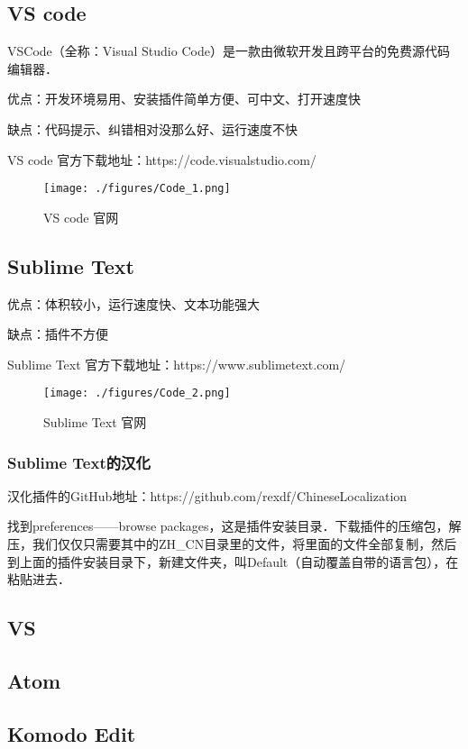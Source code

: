 
\begin{issues}
\issueTODO
\end{issues}

\subsection{VS code}

VSCode（全称：Visual Studio Code）是一款由微软开发且跨平台的免费源代码编辑器．

优点：开发环境易用、安装插件简单方便、可中文、打开速度快

缺点：代码提示、纠错相对没那么好、运行速度不快

VS code 官方下载地址：https://code.visualstudio.com/

\begin{figure}[ht]
\centering
\texttt{[image: ./figures/Code\_1.png]}
\caption{VS code 官网} \label{Code_fig1}
\end{figure}

\subsection{Sublime Text}

优点：体积较小，运行速度快、文本功能强大

缺点：插件不方便

Sublime Text 官方下载地址：https://www.sublimetext.com/

\begin{figure}[ht]
\centering
\texttt{[image: ./figures/Code\_2.png]}
\caption{Sublime Text 官网} \label{Code_fig2}
\end{figure}

\subsubsection{Sublime Text的汉化}

汉化插件的GitHub地址：https://github.com/rexdf/ChineseLocalization

找到preferences——browse packages，这是插件安装目录．下载插件的压缩包，解压，我们仅仅只需要其中的ZH_CN目录里的文件，将里面的文件全部复制，然后到上面的插件安装目录下，新建文件夹，叫Default（自动覆盖自带的语言包），在粘贴进去．

\subsection{VS}

\subsection{Atom}

\subsection{Komodo Edit}
